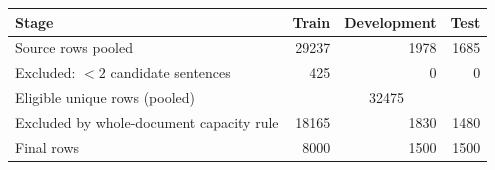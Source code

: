 \begin{tabular}{lrrr}
\toprule
Stage & Train & Development & Test \\
\midrule
Source rows pooled & 29237 & 1978 & 1685 \\
Excluded: $<2$ candidate sentences & 425 & 0 & 0 \\
Eligible unique rows (pooled) & \multicolumn{3}{c}{32475} \\
Excluded by whole-document capacity rule & 18165 & 1830 & 1480 \\
Final rows & 8000 & 1500 & 1500 \\
\bottomrule
\end{tabular}
